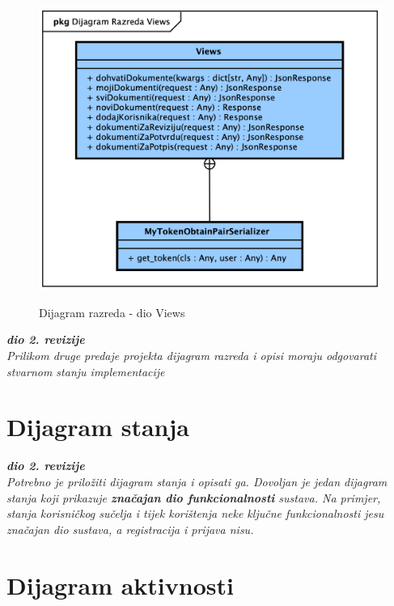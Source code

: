 			\begin{figure}[H]
				\
				\includegraphics[width=\textwidth]{slike/Class_Views.png}
				\caption{Dijagram razreda - dio Views}
				\label{fig:class_views}
			\end{figure}

			\textbf{\textit{dio 2. revizije}}\\			
			
			\textit{Prilikom druge predaje projekta dijagram razreda i opisi moraju odgovarati stvarnom stanju implementacije}
			
			
			
			\eject
		
		\section{Dijagram stanja}
			
			
			\textbf{\textit{dio 2. revizije}}\\
			
			\textit{Potrebno je priložiti dijagram stanja i opisati ga. Dovoljan je jedan dijagram stanja koji prikazuje \textbf{značajan dio funkcionalnosti} sustava. Na primjer, stanja korisničkog sučelja i tijek korištenja neke ključne funkcionalnosti jesu značajan dio sustava, a registracija i prijava nisu. }
			
			
			\eject 
		
		\section{Dijagram aktivnosti}
			
